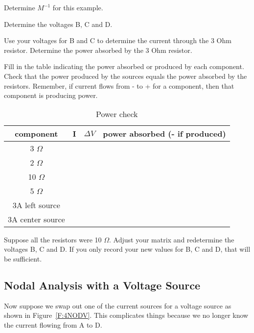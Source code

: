 \begin{blevel}
Determine $M^{-1}$ for this example.
\end{blevel}

\begin{clevel}
Determine the voltages B, C and D.
\end{clevel}

\begin{blevel}
Use your voltages for B and C to determine the current through the 3 Ohm resistor. Determine the power absorbed by the 3 Ohm resistor.
\end{blevel}

\begin{clevel}
Fill in the table indicating the power absorbed or produced by each component. Check that the power produced by the sources equals the power absorbed by the resistors. Remember, if current flows from - to + for a component, then that component is producing power.
\begin{table}[H]
\begin{center}
\begin{tabular}{|c|c|c|c|} \hline
component & I&$\Delta V$&power absorbed (- if produced) \\ \hline
3 $\Omega$ &&&	\\ \hline
2 $\Omega$&&&	\\ \hline
10 $\Omega$ &&&	\\ \hline
5 $\Omega$ &&&	\\ \hline
3A left source &&&	\\ \hline
3A center source &&&	\\ \hline
\end{tabular}
\caption{Power check}
\label{T:4PCheck}
\end{center}
\end{table}
\end{clevel}

\begin{clevel}
Suppose all the resistors were 10 $\Omega$. Adjust your matrix and redetermine the voltages B, C and D. If you only record your new values for B, C and D, that will be sufficient.
\end{clevel}

\subsection{Nodal Analysis with a Voltage Source}
Now suppose we swap out one of the current sources for a voltage source as shown in Figure~\ref{F:4NODV}. This complicates things because we no longer know the current flowing from A to D.

